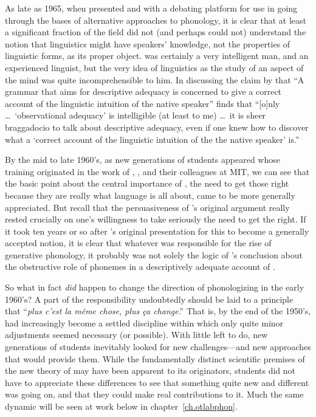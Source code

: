 As late as 1965, when {\Householder} presented {\Chomsky} and {\Halle} with a
debating platform for use in going through the bases of alternative
approaches to phonology, it is clear that at least a significant
fraction of the field did not (and perhaps could not) understand the
notion that linguistics might have speakers' knowledge, not the
properties of linguistic forms, as its proper object. 
was certainly a very intelligent man, and an experienced linguist, but
the very idea of linguistics as the study of an aspect of the mind was
quite incomprehensible to him. In discussing the claim by
\citet{chomsky:lblt} that ``A grammar that aims for descriptive
adequacy is concerned to give a correct account of the linguistic
intuition of the native speaker''
\citet[14]{householder:recent_claims} finds that ``[o]nly \ldots\
`observational adequacy' is intelligible (at least to me) \ldots\ it
is sheer braggadocio to talk about descriptive adequacy, even if one
knew how to discover what a `correct account of the linguistic
intuition of the the native speaker' is.''
  
By the mid to late 1960's, as new generations of students appeared
whose training originated in the work of {\Chomsky}, {\Halle}, and their
colleagues at MIT, we can see that the basic point about the central
importance of \isi{rules}, the need to get those right because they are
really what language is all about, came to be more generally
appreciated. But recall that the persuasiveness of {\Halle}'s original
argument really rested crucially on one's willingness to take
seriously the need to get the  right. If it took ten years or so
after {\Halle}'s original presentation for this to become a generally
accepted notion, it is clear that whatever was responsible for the
rise of generative phonology, it probably was not solely the logic of
{\Halle}'s conclusion about the obstructive role of phonemes in a
descriptively adequate account of \ili{Russian} \isi{voicing} .

So what in fact \emph{did} happen to {change} the direction of
phonologizing in the early 1960's? A part of the responsibility
undoubtedly should be laid to a principle that ``\emph{plus c'est la
  m\^eme chose, plus \c{c}a change}.'' That is, by the end of the
1950's, \isi{phonemic theory} had increasingly become a settled discipline
within which only quite minor adjustments seemed necessary (or
possible). With little left to do, new generations of students
inevitably looked for new challenges---and new approaches that would
provide them. While the fundamentally distinct scientific premises of
the new theory of \isi{generative grammar} may have been apparent to its
originators, students did not have to appreciate these differences to
see that something quite new and different was going on, and that they
could make real contributions to it. Much the same dynamic will be
seen at work below in chapter~\ref{ch.otlabphon}.

